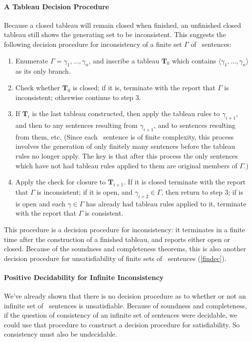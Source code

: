 \paragraph{A Tableau Decision Procedure} Because a closed tableau will remain closed when finished, an unfinished closed tableau still shows the generating set to be inconsistent. This suggests the following decision procedure for inconsistency of a finite set $\Gamma$ of \lone\ sentences:
\begin{enumerate}
	\item Enumerate $\Gamma = \gamma_{1},…,\gamma_{n}$, and inscribe a tableau $\mathbf{T}_{0}$ which contains $\langle \gamma_{1},…,\gamma_{n}\rangle$ as its only branch.
	\item Check whether $\mathbf{T}_{0}$ is closed; if it is, terminate with the report that $\Gamma$ is inconsistent; otherwise continue to step 3.
	\item If $\mathbf{T}_{i}$ is the last tableau constructed, then apply the tableau rules to $\gamma_{i+1}$, and then to any sentences resulting from $\gamma_{i+1}$, and to sentences resulting from them, etc. (Since each \lone\ sentence is of finite complexity, this process involves the generation of only finitely many sentences before the tableau rules no longer apply. The key is that after this process the only sentences which have not had tableau rules applied to them are original members of $\Gamma$.) 
	\item Apply the check for closure to $\mathbf{T}_{i+1}$. If it is closed terminate with the report that $\Gamma$ is inconsistent; if it is open, and $\gamma_{i+2}\in \Gamma$, then return to step 3; if is is open and each $\gamma\in \Gamma$ has already had tableau rules applied to it, terminate with the report that $\Gamma$ is consistent. 
\end{enumerate}

 This procedure is a decision procedure for inconsistency: it terminates in a finite time after the construction of a finished tableau, and reports either open or closed. Because of the soundness and completeness theorems, this is also another decision procedure for unsatisfiability of finite sets of \lone\ sentences (\autoref{findec}).

\paragraph{Positive Decidability for Infinite Inconsistency} We've already shown that there is no decision procedure as to whether or not an infinite set of \lone\ sentences is unsatisfiable. Because of soundness and completeness, if the question of consistency of an infinite set of sentences were decidable, we could use that procedure to construct a decision procedure for satisfiability. So consistency must also be undecidable.

